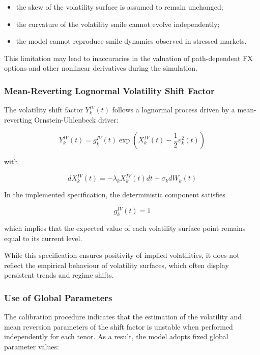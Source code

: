 \begin{itemize}
	\item the skew of the volatility surface is assumed to remain unchanged;
	\item the curvature of the volatility smile cannot evolve independently;
	\item the model cannot reproduce smile dynamics observed in stressed markets.
\end{itemize}

This limitation may lead to inaccuracies in the valuation of path-dependent FX options and other nonlinear derivatives during the simulation.

\subsubsection{Mean-Reverting Lognormal Volatility Shift Factor}

The volatility shift factor $Y_k^{IV}(t)$ follows a lognormal process driven by a mean-reverting Ornstein-Uhlenbeck driver:

\begin{equation}
	Y_k^{IV}(t) = g_k^{IV}(t) \exp \left( X_k^{IV}(t) - \frac{1}{2} v_k^2(t) \right)
\end{equation}

with

\begin{equation}
	dX_k^{IV}(t) = -\lambda_k X_k^{IV}(t) dt + \sigma_k dW_k(t)
\end{equation}

In the implemented specification, the deterministic component satisfies

\begin{equation}
	g_k^{IV}(t) = 1
\end{equation}

which implies that the expected value of each volatility surface point remains equal to its current level.

While this specification ensures positivity of implied volatilities, it does not reflect the empirical behaviour of volatility surfaces, which often display persistent trends and regime shifts.

\subsubsection{Use of Global Parameters}

The calibration procedure indicates that the estimation of the volatility and mean reversion parameters of the shift factor is unstable when performed independently for each tenor. As a result, the model adopts fixed global parameter values:

